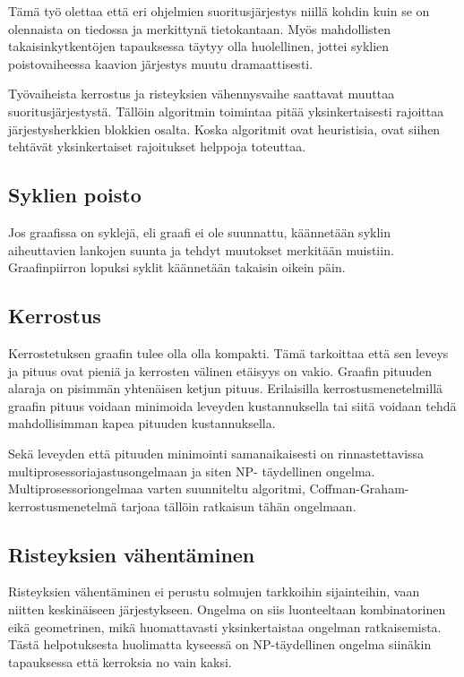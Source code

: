 \documentclass[finnish,12pt]{article}
\begin{document}
Tämä työ olettaa että eri ohjelmien suoritusjärjestys niillä kohdin kuin se on
olennaista on tiedossa ja merkittynä tietokantaan.
Myös mahdollisten takaisinkytkentöjen tapauksessa täytyy olla huolellinen, jottei syklien poistovaiheessa kaavion järjestys muutu dramaattisesti.

Työvaiheista kerrostus ja risteyksien vähennysvaihe saattavat muuttaa suoritusjärjestystä. Tällöin algoritmin toimintaa pitää yksinkertaisesti rajoittaa järjestysherkkien blokkien osalta. Koska algoritmit ovat heuristisia, ovat siihen tehtävät yksinkertaiset rajoitukset helppoja toteuttaa.

		\subsection{Syklien poisto}

Jos graafissa on syklejä, eli graafi ei ole suunnattu, käännetään syklin
aiheuttavien lankojen suunta ja tehdyt muutokset merkitään muistiin.
Graafinpiirron lopuksi syklit käännetään takaisin oikein päin.

		\subsection{Kerrostus}

Kerrostetuksen graafin tulee olla olla kompakti. Tämä tarkoittaa että sen leveys
ja pituus ovat pieniä ja kerrosten välinen etäisyys on vakio. Graafin pituuden
alaraja on pisimmän yhtenäisen ketjun pituus.
Erilaisilla kerrostusmenetelmillä graafin pituus voidaan
minimoida leveyden kustannuksella tai siitä voidaan tehdä mahdollisimman kapea
pituuden kustannuksella.

Sekä leveyden että pituuden minimointi samanaikaisesti on rinnastettavissa
multiprosessoriajastusongelmaan ja siten NP- täydellinen ongelma.
\cite{RefWorks:39} Multiprosessoriongelmaa varten suunniteltu algoritmi,
Coffman-Graham-kerrostusmenetelmä tarjoaa tällöin ratkaisun tähän ongelmaan.

		\subsection{Risteyksien vähentäminen}

Risteyksien vähentäminen ei perustu solmujen tarkkoihin sijainteihin, vaan
niitten keskinäiseen järjestykseen. Ongelma on siis luonteeltaan kombinatorinen
eikä geometrinen, mikä huomattavasti yksinkertaistaa ongelman ratkaisemista.
Tästä helpotuksesta huolimatta kyseessä on NP-täydellinen ongelma siinäkin
tapauksessa että kerroksia no vain kaksi. \cite{RefWorks:40}
\end{document}
